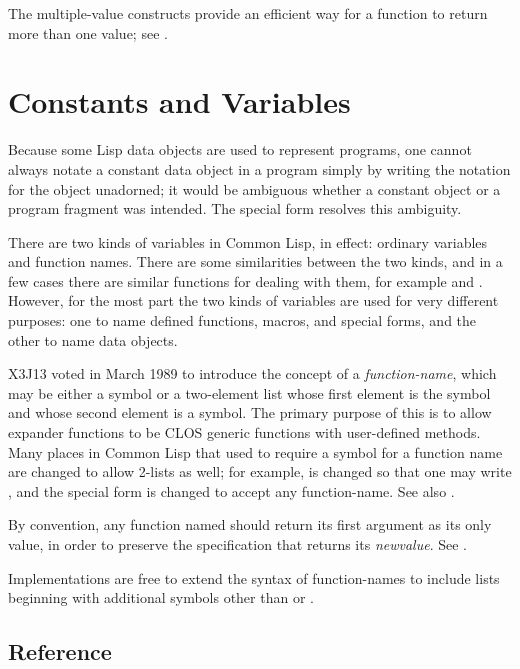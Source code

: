 The multiple-value constructs provide an efficient way for a function
to return more than one value; see .

\section{Constants and Variables}
\label{FUNCTION-NAME-SECTION}

Because some Lisp data objects are used to represent programs,
one cannot always notate a constant data object in a program simply
by writing the notation for the object unadorned; it would be ambiguous
whether a constant object or a program fragment was intended.
The  special form resolves this ambiguity.

There are two kinds of variables in Common Lisp, in effect: ordinary
variables and function names.  There are some similarities between
the two kinds, and in a few cases there are similar functions for
dealing with them, for example  and .
However, for the most part the two kinds of variables are
used for very different purposes: one to name defined functions,
macros, and special forms, and the other to name data objects.

\begin{newer}
X3J13 voted in March 1989  to introduce the concept
of a \textit{function-name}, which may be either a symbol or a two-element list whose
first element is the symbol  and whose second element is a symbol.
The primary purpose of this is to allow  expander functions to be
CLOS generic functions with user-defined methods.
Many places in Common Lisp that used to require a symbol for a function
name are changed to allow 2-lists as well; for example, 
is changed so that one may write ,
and the  special form is changed to accept any function-name.
See also .

By convention, any function named  should return its first
argument as its only value, in order to preserve the specification that
 returns its \textit{newvalue}.  See .

Implementations are free to extend the syntax of function-names to
include lists beginning with additional symbols other than 
or .
\end{newer}

\subsection{Reference}

